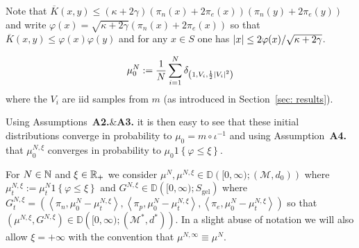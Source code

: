 
Note that $\overline{K}(x,y)\leq (\kappa + 2\gamma) \left(\pi_n(x)+2\pi_e(x)\right) \left(\pi_n(y)+2\pi_e(y)\right)$ and write $\varphi(x) = \sqrt{\kappa + 2\gamma}\left(\pi_n(x)+2\pi_e(x)\right)$ so that $\overline{K}(x,y)\leq \varphi(x)\varphi(y)$ and for any $x \in S$ one has $\left\lvert{x}\right\rvert \leq 2 \varphi(x) /\sqrt{\kappa + 2\gamma} $.


\begin{definition}
\begin{equation*}
    \mu^N_0 := \frac1N \sum_{i=1}^N \delta_{\left(1,V_i, \frac12 \left\lvert{V_i}\right\rvert^2\right)}
\end{equation*}
where the $V_i$ are iid samples from $m$ (as introduced in Section~\ref{sec: results}).
\end{definition}
Using Assumptions~\textbf{A2.}\&\textbf{A3.} it is then easy to see that these initial distributions converge in probability to $\mu_0 = m\circ \iota^{-1}$ and using Assumption~\textbf{A4.} that $\mu_0^{N,\xi}$ converges in probability to $\mu_0 1\left\{\varphi \leq \xi\right\}$.

For $N\in\mathbb{N}$ and $\xi \in \mathbb{R}_+$ we consider $\mu^N, \mu^{N,\xi} \in \mathbb{D}\left([0,\infty); \left(\mathcal{M}, d_0\right)\right)$ where
$\mu^{N,\xi}_t := \mu^N_t 1\left\{\varphi \leq \xi\right\}$
and $G^{N,\xi} \in \mathbb{D}\left([0,\infty); S_\mathrm{gel}\right)$ where
$G^{N,\xi}_t = \left(\left<\pi_n, \mu_0^N -\mu^{N,\xi}_t\right>, \left<\pi_p, \mu_0^N -\mu^{N,\xi}_t\right>, \left<\pi_e, \mu_0^N -\mu^{N,\xi}_t\right>\right)$ so that
$\left(\mu^{N,\xi}, G^{N,\xi}\right) \in \mathbb{D}\left([0,\infty); \left(\mathcal{M}^\ast, d^\ast\right)\right)$.
In a slight abuse of notation we will also allow $\xi = + \infty$ with the convention that $\mu^{N,\infty} \equiv \mu^N$.


